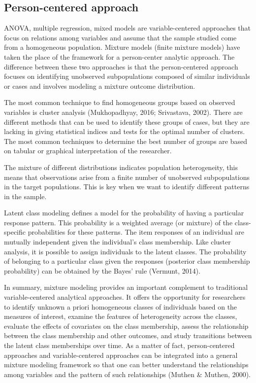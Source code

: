 \documentclass[12pt,a4paper,oneside]{reedthesis}
\begin{document}
\hypertarget{person-centered-approach}{%
\subsection{Person-centered approach}\label{person-centered-approach}}

ANOVA, multiple regression, mixed models are variable-centered approaches that focus on relations among variables and assume that the sample studied come from a homogeneous population. Mixture models (finite mixture models) have taken the place of the framework for a person-center analytic approach. The difference between these two approaches is that the person-centered approach focuses on identifying unobserved subpopulations composed of similar individuals or cases and involves modeling a mixture outcome distribution.

The most common technique to find homogeneous groups based on observed variables is cluster analysis (Mukhopadhyay, 2016; Srivastava, 2002). There are different methods that can be used to identify these groups of cases, but they are lacking in giving statistical indices and tests for the optimal number of clusters. The most common techniques to determine the best number of groups are based on tabular or graphical interpretation of the researcher.

The mixture of different distributions indicates population heterogeneity, this means that observations arise from a finite number of unobserved subpopulations in the target populations. This is key when we want to identify different patterns in the sample.

Latent class modeling defines a model for the probability of having a particular response pattern. This probability is a weighted average (or mixture) of the class-specific probabilities for these patterns. The item responses of an individual are mutually independent given the individual's class membership. Like cluster analysis, it is possible to assign individuals to the latent classes. The probability of belonging to a particular class given the responses (posterior class membership probability) can be obtained by the Bayes' rule (Vermunt, 2014).

In summary, mixture modeling provides an important complement to traditional variable-centered analytical approaches. It offers the opportunity for researchers to identify unknown a priori homogeneous classes of individuals based on the measures of interest, examine the features of heterogeneity across the classes, evaluate the effects of covariates on the class membership, assess the relationship between the class membership and other outcomes, and study transitions between the latent class memberships over time. As a matter of fact, person-centered approaches and variable-centered approaches can be integrated into a general mixture modeling framework so that one can better understand the relationships among variables and the pattern of such relationships (Muthen \& Muthen, 2000).
\end{document}
